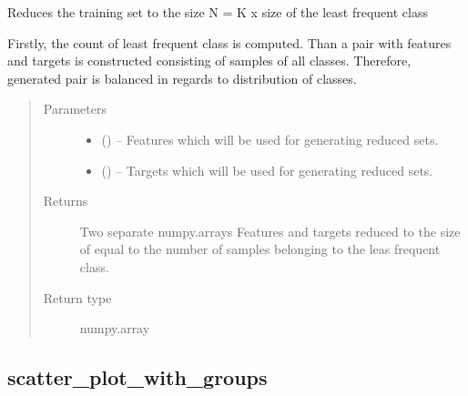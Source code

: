 \documentclass[a4paper,10pt,english]{sphinxmanual}
\begin{document}
\begin{fulllineitems}
\label{\detokenize{api/ucf.reduce_set_to_equal_distribution_of_classes:ucf.reduce_set_to_equal_distribution_of_classes}}
Reduces the training set to the size N = K x size of the
least frequent class

Firstly, the count of least frequent class is computed. Than a pair
with features and targets is constructed consisting of samples of
all classes. Therefore, generated pair is balanced in regards to
distribution of classes.
\begin{quote}\begin{description}
\item[{Parameters}] \leavevmode\begin{itemize}
\item {} 
 () -- Features which will be used for generating reduced sets.

\item {} 
 () -- Targets which will be used for generating reduced sets.

\end{itemize}

\item[{Returns}] \leavevmode
Two separate numpy.arrays Features and targets reduced to the size of
equal to the number of samples belonging to the leas frequent class.

\item[{Return type}] \leavevmode
numpy.array

\end{description}\end{quote}

\end{fulllineitems}



\subsection{scatter\_plot\_with\_groups}
\label{\detokenize{api/ucf.scatter_plot_with_groups:scatter-plot-with-groups}}\label{\detokenize{api/ucf.scatter_plot_with_groups::doc}}
\end{document}
